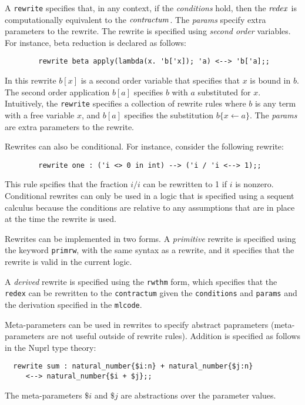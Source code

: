 \documentclass{article}
\begin{document}
A {\tt rewrite} specifies that, in any context, if the {\it conditions\/} hold, then the ${\it redex}$ is
computationally equivalent to the ${\it contractum}$.  The {\it params\/} specify extra parameters
to the rewrite.  The rewrite is specified using {\em second order\/} variables.
For instance, beta reduction is declared as follows:

\begin{verbatim}
        rewrite beta apply(lambda(x. 'b['x]); 'a) <--> 'b['a];;
\end{verbatim}

In this rewrite $b[x]$ is a second order variable that specifies that $x$ is bound in $b$.  The
second order application $b[a]$ specifies $b$ with $a$ substituted for $x$.
Intuitively, the {\tt rewrite} specifies a collection of rewrite rules where $b$ is any term with a
free variable $x$, and $b[a]$ specifies the substitution $b\{x \leftarrow a\}$.
The {\it params\/} are extra parameters to the rewrite.

Rewrites can also be conditional.
For instance, consider the following rewrite:

\begin{verbatim}
        rewrite one : ('i <> 0 in int) --> ('i / 'i <--> 1);;
\end{verbatim}

This rule spcifies that the fraction $i / i$ can be rewritten to 1 if $i$ is nonzero.
Conditional rewrites can only be used in a logic that is specified using a sequent calculus because
the conditions are relative to any assumptions that are in place at the time the rewrite is used.

Rewrites can be implemented in two forms.  A {\em primitive\/} rewrite is specified using the
keyword {\tt primrw}, with the same syntax as a rewrite, and it specifies that the rewrite is valid
in the current logic.

A {\em derived\/} rewrite is specified using the {\tt rwthm\/} form, which specifies that the {\tt
redex} can be rewritten to the {\tt contractum} given the {\tt conditions} and {\tt params} and the
derivation specified in the {\tt mlcode}.

Meta-parameters can be used in rewrites to specify abstract paprameters (meta-parameters are not
useful outside of rewrite rules).  Addition is specified as follows in the Nuprl type
theory:

\begin{verbatim}
  rewrite sum : natural_number{$i:n} + natural_number{$j:n}
     <--> natural_number{$i + $j};;
\end{verbatim}
The meta-parameters $\$i$ and $\$j$ are abstractions over the parameter values.
\end{document}
